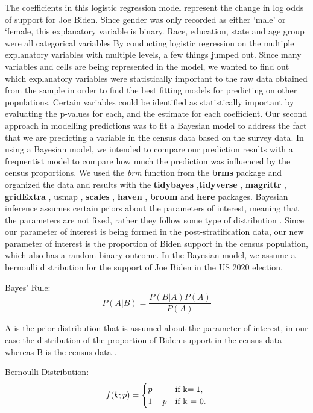 \documentclass[
]{article}
\begin{document}
The coefficients in this logistic regression model represent the change in log odds of support for Joe Biden. Since gender was only recorded as either `male' or `female, this explanatory variable is binary. Race, education, state and age group were all categorical variables
By conducting logistic regression on the multiple explanatory variables with multiple levels, a few things jumped out. Since many variables and cells are being represented in the model, we wanted to find out which explanatory variables were statistically important to the raw data obtained from the sample in order to find the best fitting models for predicting on other populations. Certain variables could be identified as statistically important by evaluating the p-values for each, and the estimate for each coefficient.
Our second approach in modelling predictions was to fit a Bayesian model to address the fact that we are predicting a variable in the census data based on the survey data. In using a Bayesian model, we intended to compare our prediction results with a frequentist model to compare how much the prediction was influenced by the census proportions. We used the \emph{brm} function from the \textbf{brms} package \citep[\citet{citerstan}]{citebrms} and organized the data and results with the \textbf{tidybayes} \citep{citetidybayes} ,\textbf{tidyverse} \citep{citetidyverse}, \textbf{magrittr} \citep{citemagrittr}, \textbf{gridExtra} \citep{citegridExtra}, usmap \citep{citeusmap}, \textbf{scales} \citep{citescales}, \textbf{haven} \citep{citehaven}, \textbf{broom} \citep{citebroom} and \textbf{here} \citep{citehere} packages. Bayesian inference assumes certain priors about the parameters of interest, meaning that the parameters are not fixed, rather they follow some type of distribution \citep{citePChristianBurkner}. Since our parameter of interest is being formed in the post-stratification data, our new parameter of interest is the proportion of Biden support in the census population, which also has a random binary outcome. In the Bayesian model, we assume a bernoulli distribution for the support of Joe Biden in the US 2020 election.

Bayes' Rule: \[ P(A|B) = \frac{P(B|A)P(A)}{P(A)} \]

A is the prior distribution that is assumed about the parameter of interest, in our case the distribution of the proportion of Biden support in the census data whereas B is the census data \citep{citeDSimpson}.

Bernoulli Distribution:
\[ f(k;p) = \begin{cases} p & \text{if k$ = 1$}, \\ 1- p & \text{if k = 0}. \end{cases} \]
\end{document}
